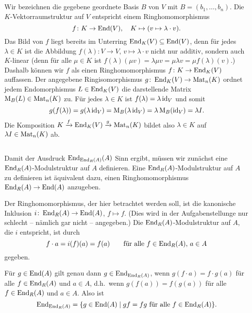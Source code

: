 \documentclass[a4paper, 10pt, numbers=noenddot]{scrartcl}
\begin{document}
\subsection{}

Wir bezeichnen die gegebene geordnete Basis $B$ von $V$ mit $B = (b_1, \dotsc, b_n)$.
Die $K$-Vektorraumstruktur auf $V$ entspricht einem Ringhomomorphismus
\[
  f \colon K \to \operatorname{End}(V),
  \quad
  K \mapsto (v \mapsto \lambda \cdot v).
\]
Das Bild von $f$ liegt bereits im Unterring $\operatorname{End}_K(V) \subseteq \operatorname{End}(V)$, denn für jedes $\lambda \in K$ ist die Abbildung $f(\lambda) \colon V \to V$, $v \mapsto \lambda \cdot v$ nicht nur additiv, sondern auch $K$-linear (denn für alle $\mu \in K$ ist $f(\lambda)(\mu v) = \lambda \mu v = \mu \lambda v = \mu f(\lambda)(v)$.)
Dashalb können wir $f$ als einen Ringhomomorphismus $f \colon K \to \operatorname{End}_K(V)$ auffassen.
Der angegebene Ringisomorphismus $g \colon \operatorname{End}_K(V) \to \operatorname{Mat}_n(K)$ ordnet jedem Endomorphismus $L \in \operatorname{End}_K(V)$ die darstellende Matrix $\operatorname{M}_B(L) \in \operatorname{Mat}_n(K)$ zu.
Für jedes $\lambda \in K$ ist $f(\lambda) = \lambda \operatorname{id}_V$ und somit
\[
    g(f(\lambda))
  = g(\lambda \operatorname{id}_V)
  = \operatorname{M}_B(\lambda \operatorname{id}_V)
  = \lambda \operatorname{M}_B(\operatorname{id}_V)
  = \lambda I.
\]
Die Komposition $K \xrightarrow{f} \operatorname{End}_K(V) \xrightarrow{g} \operatorname{Mat}_n(K)$ bildet also $\lambda \in K$ auf $\lambda I \in \operatorname{Mat}_n(K)$ ab.





\subsection{}

Damit der Ausdruck $\operatorname{End}_{\operatorname{End}_R(A)}(A)$ Sinn ergibt, müssen wir zunächst eine $\operatorname{End}_R(A)$-Mo\-dul\-struk\-tur auf $A$ definieren.
Eine $\operatorname{End}_R(A)$-Modulstruktur auf $A$ zu definieren ist äquivalent dazu, einen Ringhomomorphismus $\operatorname{End}_R(A) \to \operatorname{End}(A)$ anzugeben.

Der Ringhomomorphismus, der hier betrachtet werden soll, ist die kanonische Inklusion $i \colon \operatorname{End}_R(A) \to \operatorname{End}(A)$, $f \mapsto f$.
(Dies wird in der Aufgabenstellunge nur schlecht -- nämlich gar nicht -- angegeben.)
Die $\operatorname{End}_R(A)$-Modulstruktur auf $A$, die $i$ entspricht, ist durch
\[
    f \cdot a
  = i(f)(a)
  = f(a)
  \qquad
  \text{für alle $f \in \operatorname{End}_R(A)$, $a \in A$}
\]
gegeben.

Für $g \in \operatorname{End}(A)$ gilt genau dann $g \in \operatorname{End}_{\operatorname{End}_R(A)}$, wenn $g(f \cdot a) = f \cdot g(a)$ für alle $f \in \operatorname{End}_R(A)$ und $a \in A$, d.h.\ wenn $g(f(a)) = f(g(a))$ für alle $f \in \operatorname{End}_R(A)$ und $a \in A$.
Also ist
\begin{equation}
  \label{eqn: description of double centralizer}
    \operatorname{End}_{\operatorname{End}_R(A)}
  = \{ g \in \operatorname{End}(A) \mid \text{$gf = fg$ für alle $f \in \operatorname{End}_R(A)$} \}.
\end{equation}
\end{document}
